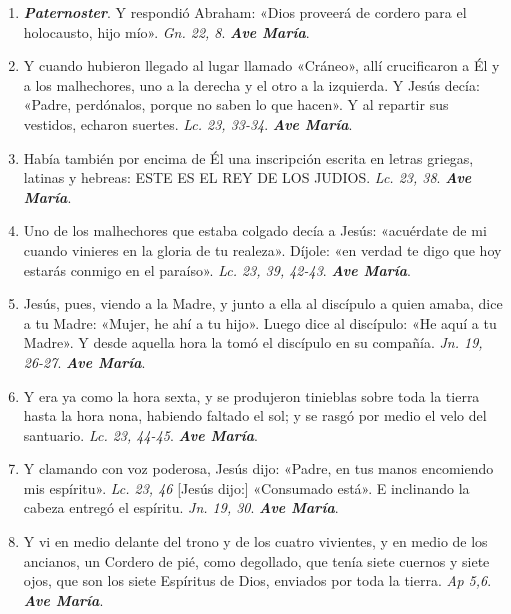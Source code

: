\documentclass[../../devocionario.tex]{subfiles}
\begin{document}
    \begin{enumerate}
    
        \item \textbf{\textit{Paternoster}}. Y respondió Abraham: «Dios proveerá de cordero para el holocausto, hijo mío». \textit{Gn. 22, 8}. \textbf{\textit{Ave María}}.

        \item Y cuando hubieron llegado al lugar llamado «Cráneo», allí crucificaron a Él y a los malhechores, 
            uno a la derecha y el otro a la izquierda. Y Jesús decía: «Padre, perdónalos, porque no saben lo que hacen». 
            Y al repartir sus vestidos, echaron suertes. \textit{Lc. 23, 33-34}. \textbf{\textit{Ave María}}.

        \item Había también por encima de Él una inscripción escrita en letras griegas, latinas y hebreas: 
            ESTE ES EL REY DE LOS JUDIOS. \textit{Lc. 23, 38}. \textbf{\textit{Ave María}}.

        \item Uno de los malhechores que estaba colgado decía a Jesús: «acuérdate de mi cuando vinieres en la gloria de tu realeza». 
            Díjole: «en verdad te digo que hoy estarás conmigo en el paraíso». \textit{Lc. 23, 39, 42-43}. \textbf{\textit{Ave María}}.

        \item Jesús, pues, viendo a la Madre, y junto a ella al discípulo a quien amaba, dice a tu Madre: 
            «Mujer, he ahí a tu hijo». Luego dice al discípulo: «He aquí a tu Madre». 
            Y desde aquella hora la tomó el discípulo en su compañía. \textit{Jn. 19, 26-27}. \textbf{\textit{Ave María}}.

        \item Y era ya como la hora sexta, y se produjeron tinieblas sobre toda la tierra hasta la hora nona, 
            habiendo faltado el sol; y se rasgó por medio el velo del santuario. \textit{Lc. 23, 44-45}. \textbf{\textit{Ave María}}.

        \item Y clamando con voz poderosa, Jesús dijo: «Padre, en tus manos encomiendo mis espíritu». \textit{Lc. 23, 46} 
            [Jesús dijo:] «Consumado está». E inclinando la cabeza entregó el espíritu. \textit{Jn. 19, 30}. \textbf{\textit{Ave María}}.

        \item Y vi en medio delante del trono y de los cuatro vivientes, y en medio de los ancianos, 
            un Cordero de pié, como degollado, que tenía siete cuernos y siete ojos, que son los siete Espíritus de Dios, 
            enviados por toda la tierra. \textit{Ap 5,6}. \textbf{\textit{Ave María}}.


\end{enumerate}
\end{document}
